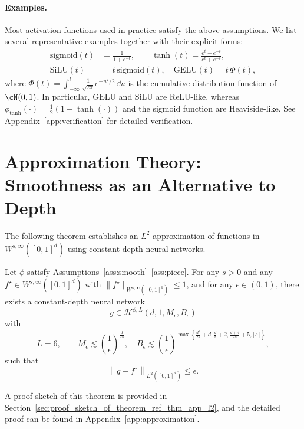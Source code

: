 \documentclass[11pt]{article}
\begin{document}
\paragraph*{Examples.}
Most activation functions used in practice satisfy the above assumptions. We list several representative examples together with their explicit forms:
\begin{align*}
{\mathrm{sigmoid}}(t) &= \frac{1}{1+e^{-t}},\qquad
\tanh(t) = \frac{e^{t}-e^{-t}}{e^{t}+e^{-t}},\\
\mathrm{SiLU}(t) &= t\,{\mathrm{sigmoid}}(t),\quad 
\mathrm{GELU}(t) = t\,\Phi(t),
\end{align*}
where $\Phi(t)=\int_{-\infty}^{t}\frac{1}{\sqrt{2\pi}}e^{-u^2/2}\,\dd u$ is the cumulative distribution function of $\cN(0,1)$.
In particular, $\mathrm{GELU}$ and $\mathrm{SiLU}$ are ReLU-like, whereas $\phi_{\tanh}(\cdot)=\tfrac12(1+\tanh(\cdot))$ and the sigmoid function are Heaviside-like.
See Appendix~\ref{app:verification} for detailed verification.

\section{Approximation Theory: Smoothness as an Alternative to Depth}
\label{subsec: construct-app}

The following theorem establishes an $L^2$-approximation  of functions in $W^{s,\infty}([0,1]^d)$ using constant-depth neural networks.
\begin{theorem}[$L^2$ approximation] \label{thm:app_L2}
    Let $\phi$ satisfy Assumptions~\ref{ass:smooth}--\ref{ass:piece}. For any $s>0$ and any $f^\star \in W^{s,\infty}([0,1]^d)$ with 
$\|f^\star\|_{W^{s,\infty}([0,1]^d)} \le 1$, and for any $\epsilon \in (0,1)$,  there exists a constant-depth neural network
\[
g \in \mathcal{H}^{\phi,L}(d,1,M_{\epsilon},B_{\epsilon})
\]
with
    \begin{equation}
       L=6, \qquad M_{\epsilon} \lesssim \left( \frac{1}{\epsilon}\right)^{\frac{d}{2s}}, \quad B_{\epsilon} \lesssim \left( \frac{1}{\epsilon}\right)^{\max \left\{\frac{d^2}{2s}+d, \frac{d}{s}+2, \frac{d+4}{2s}+5, \lceil s \rceil\right\}},
        \label{eq:norm_width_app_L2}
    \end{equation}
    such that 
    \begin{equation*}
        \left\| g - f^\star\right\|_{L^2([0,1]^d)} \leq \epsilon.
    \end{equation*}
\end{theorem}
A proof sketch of this theorem is provided in Section~\ref{sec:proof_sketch_of_theorem_ref_thm_app_l2}, and the detailed proof can be found in Appendix~\ref{app:approximation}.
\end{document}
